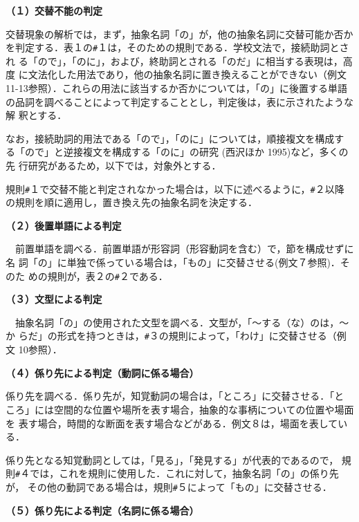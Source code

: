 {\bf （１）交替不能の判定}

交替現象の解析では，まず，抽象名詞「の」が，他の抽象名詞に交替可能か否か
を判定する．表１の{\verb+#+}１は，そのための規則である．学校文法で，接続助詞とされ
る「ので」，「のに」，および，終助詞とされる「のだ」に相当する表現は，高度
に文法化した用法であり，他の抽象名詞に置き換えることができない（例文
11-13参照）．これらの用法に該当するか否かについては，「の」に後置する単語
の品詞を調べることによって判定することとし，判定後は，表に示されたような解
釈とする．

なお，接続助詞的用法である「ので」，「のに」については，順接複文を構成す
る「ので」と逆接複文を構成する「のに」の研究 (西沢ほか 1995)など，多くの先
行研究があるため，以下では，対象外とする．

規則{\verb+#+}１で交替不能と判定されなかった場合は，以下に述べるように，{\verb+#+}２以降
の規則を順に適用し，置き換え先の抽象名詞を決定する．

\vspace{6pt}

{\bf （２）後置単語による判定}

　前置単語を調べる．前置単語が形容詞（形容動詞を含む）で，節を構成せずに名
詞「の」に単独で係っている場合は，「もの」に交替させる(例文７参照)．そのた
めの規則が，表２の{\verb+#+}２である．

\vspace{6pt}

{\bf （３）文型による判定}

　抽象名詞「の」の使用された文型を調べる．文型が，「〜する（な）のは，〜か
らだ」の形式を持つときは，{\verb+#+}３の規則によって，「わけ」に交替させる（例文
10参照）．

\vspace{6pt}

{\bf （４）係り先による判定（動詞に係る場合）}

係り先を調べる．係り先が，知覚動詞の場合は，「ところ」に交替させる．「と
ころ」には空間的な位置や場所を表す場合，抽象的な事柄についての位置や場面を
表す場合，時間的な断面を表す場合などがある．例文８は，場面を表している．

係り先となる知覚動詞としては，「見る」，「発見する」が代表的であるので，
規則{\verb+#+}４では，これを規則に使用した．これに対して，抽象名詞「の」の係り先が，
その他の動詞である場合は，規則{\verb+#+}５によって「もの」に交替させる．

\vspace{6pt}

{\bf （５）係り先による判定（名詞に係る場合）}

